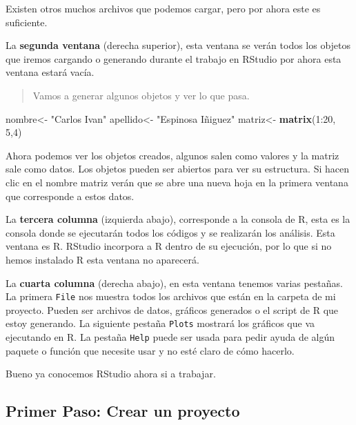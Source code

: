 \documentclass[]{article}
\newenvironment{Shaded}{\begin{snugshade}}{\end{snugshade}}
\newcommand{\KeywordTok}[1]{\textcolor[rgb]{0.13,0.29,0.53}{\textbf{{#1}}}}
\newcommand{\DecValTok}[1]{\textcolor[rgb]{0.00,0.00,0.81}{{#1}}}
\newcommand{\StringTok}[1]{\textcolor[rgb]{0.31,0.60,0.02}{{#1}}}
\newcommand{\NormalTok}[1]{{#1}}
\begin{document}
Existen otros muchos archivos que podemos cargar, pero por ahora este es
suficiente.

La \textbf{segunda ventana} (derecha superior), esta ventana se verán
todos los objetos que iremos cargando o generando durante el trabajo en
RStudio por ahora esta ventana estará vacía.

\begin{quote}
Vamos a generar algunos objetos y ver lo que pasa.
\end{quote}

\begin{Shaded}
\begin{Highlighting}[]
\NormalTok{nombre<-}\StringTok{ "Carlos Ivan"}
\NormalTok{apellido<-}\StringTok{ "Espinosa Iñiguez"}
\NormalTok{matriz<-}\StringTok{ }\KeywordTok{matrix}\NormalTok{(}\DecValTok{1}\NormalTok{:}\DecValTok{20}\NormalTok{, }\DecValTok{5}\NormalTok{,}\DecValTok{4}\NormalTok{)}
\end{Highlighting}
\end{Shaded}

Ahora podemos ver los objetos creados, algunos salen como valores y la
matriz sale como datos. Los objetos pueden ser abiertos para ver su
estructura. Si hacen clic en el nombre matriz verán que se abre una
nueva hoja en la primera ventana que corresponde a estos datos.

La \textbf{tercera columna} (izquierda abajo), corresponde a la consola
de R, esta es la consola donde se ejecutarán todos los códigos y se
realizarán los análisis. Esta ventana es R. RStudio incorpora a R dentro
de su ejecución, por lo que si no hemos instalado R esta ventana no
aparecerá.

La \textbf{cuarta columna} (derecha abajo), en esta ventana tenemos
varias pestañas. La primera \texttt{File} nos muestra todos los archivos
que están en la carpeta de mi proyecto. Pueden ser archivos de datos,
gráficos generados o el script de R que estoy generando. La siguiente
pestaña \texttt{Plots} mostrará los gráficos que va ejecutando en R. La
pestaña \texttt{Help} puede ser usada para pedir ayuda de algún paquete
o función que necesite usar y no esté claro de cómo hacerlo.

Bueno ya conocemos RStudio ahora si a trabajar.

\subsection{Primer Paso: Crear un
proyecto}\label{primer-paso-crear-un-proyecto}
\end{document}

